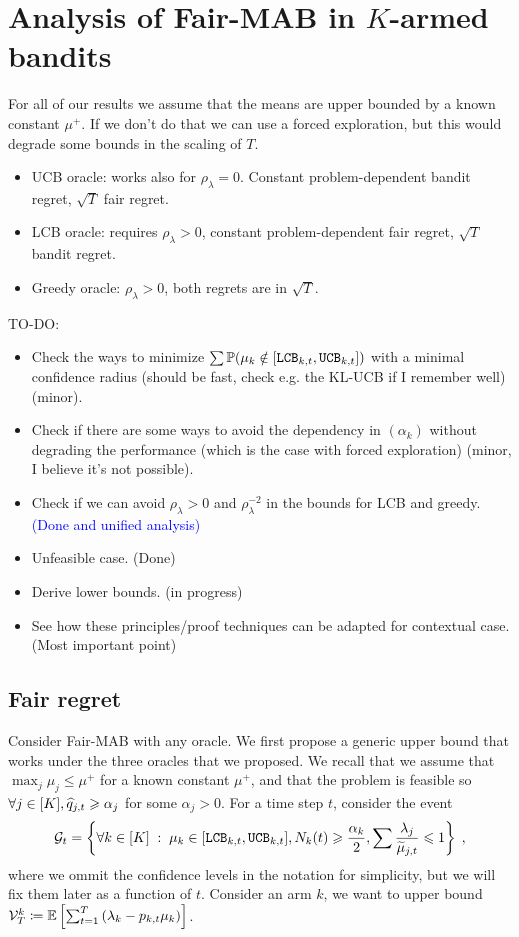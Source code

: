 \section{Analysis of Fair-MAB in $K$-armed bandits}

For all of our results we assume that the means are upper bounded by a known constant $\mu^+$. If we don't do that we can use a forced exploration, but this would degrade some bounds in the scaling of $T$.
\begin{itemize}
	\item UCB oracle: works also for $\rho_\lambda=0$. Constant problem-dependent bandit regret, $\sqrt{T}$ fair regret.	
	\item LCB oracle: requires $\rho_\lambda>0$, constant problem-dependent fair regret, $\sqrt{T}$ bandit regret.
	\item Greedy oracle: $\rho_\lambda>0$, both regrets are in $\sqrt{T}$. 
\end{itemize}

TO-DO:
\begin{itemize}
	\item Check the ways to minimize $\sum \mathbb{P}(\mu_k \notin [\texttt{LCB}_{k,t}, \texttt{UCB}_{k, t}])$ with a minimal confidence radius (should be fast, check e.g. the KL-UCB if I remember well) (minor).
	\item Check if there are some ways to avoid the dependency in $(\alpha_k)$ without degrading the performance (which is the case with forced exploration) (minor, I believe it's not possible).
	\item Check if we can avoid $\rho_\lambda>0$ and $\rho_\lambda^{-2}$ in the bounds for LCB and greedy. \textcolor{blue}{(Done and unified analysis)}
	\item Unfeasible case. (Done)
	\item Derive lower bounds. (in progress)
	\item See how these principles/proof techniques can be adapted for contextual case. (Most important point)
\end{itemize}


\subsection{Fair regret}

Consider Fair-MAB with any oracle. We first propose a generic upper bound that works under the three oracles that we proposed. We recall that we assume that $\max_j \mu_j \leq \mu^+$ for a known constant $\mu^+$, and that the problem is feasible so $\forall j \in [K], \widehat{q}_{j,t}  \geqslant \alpha_j$ for some $\alpha_j>0$. For a time step $t$, consider the event \[\mathcal{G}_t=\left\{ \forall k \in [K]\;:\; \mu_k \in [\texttt{LCB}_{k, t}, \texttt{UCB}_{k, t}], N_k(t)\geqslant \frac{\alpha_k}{2}, \sum\frac{\lambda_j}{\widetilde{\mu}_{j,t}} \leqslant 1 \right\}\;,\]
 where we ommit the confidence levels in the notation for simplicity, but we will fix them later as a function of $t$. Consider an arm $k$, we want to upper bound $\mathcal{V}_T^k \coloneqq \mathbb{E}\left[\sum_{t=1}^T \left(\lambda_k-p_{k,t} \mu_k \right)\right]$.
 
